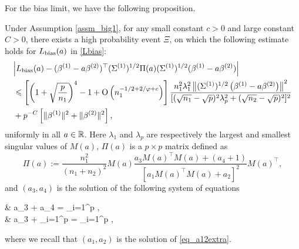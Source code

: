 For the bias limit, we have the following proposition.

\begin{proposition}\label{prop_main_RMT}
Under Assumption \ref{assm_big1}, for any small constant $c>0$ and large constant $C>0$, there exists a high probability event $\Xi$, on which the following estimate  holds for $L_{\text{bias}}(a)$ in \eqref{Lbias}:
			\begin{align}
				& \bigabs{ L_{\bias}(a) -   (\beta^{(1)}- a\beta^{(2)} )^\top (\Sigma^{(1)})^{1/2} \Pi(a)(\Sigma^{(1)})^{1/2} (\beta^{(1)}- a\beta^{(2)})   }  \nonumber\\
				& \le \left[\left( 1+\sqrt{\frac{p}{n_1}}\right)^4 - 1 +\OO\left( n_1^{-1/2+2/\varphi + c}\right)\right] \frac{n_1^2 \lambda_1^2 \left\|(\Sigma^{(1)})^{1/2} \left(\beta^{(1)}- a\beta^{(2)}\right) \right\|^2}{  [(\sqrt{n_1}-\sqrt{p})^2 \lambda_p^2+ (\sqrt{n_2}-\sqrt{p})^2]^2}  \nonumber\\
				& + p^{-C} \left[\| \beta^{(1)}\|^2 + \| \beta^{(2)}\|^2 \right], \label{lem_cov_derv_eq}
			\end{align}
				uniformly in all $a\in \mathbb{R}$. Here $\lambda_1$ and $\lambda_p$ are respectively the largest and smallest singular values of $M(a)$, $\Pi(a)$ is a $p\times p$ matrix defined as
				$$\Pi(a):=\frac{n_1^2}{(n_1+n_2)^2}  M(a)  \frac{a_3 M(a)^\top M(a) + (a_4 + 1) }{[a_1 M(a)^\top M(a) + a_2 ]^2} M(a)^\top  ,$$
				 and $(a_{3},a_4)$ is the solution of the following system of equations %
		\be  \label{eq_a34extra}
		\begin{split}
				& a_3 + a_4 = \sum_{i=1}^p , \\
				& a_3 +  \sum_{i=1}^p  =  \sum_{i=1}^p ,
			\end{split}
			\ee
			where we recall that $(a_1,a_2)$ is the solution of \eqref{eq_a12extra}.
\end{proposition}

